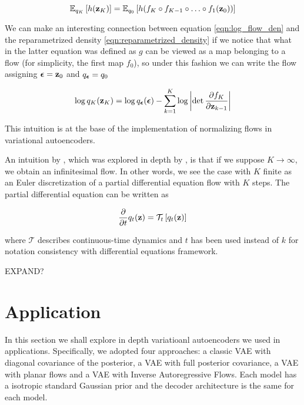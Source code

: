 \documentclass[12pt]{article}
\begin{document}
\begin{equation}
    \mathbb{E}_{q_K}\left[h(\textbf{z}_K)\right] = \mathbb{E}_{q_0}\left[h(f_K \circ f_{K-1} \circ \ldots \circ f_1(\textbf{z}_0))\right]
\end{equation}

We can make an interesting connection between equation \eqref{eqn:log_flow_den} and the reparametrized density \eqref{eqn:reparametrized_density} if we notice that what in the latter equation was defined as \(g\) can be viewed as a map belonging to a flow (for simplicity, the first map \(f_0\)), so under this fashion we can write the flow assigning \(\bm{\epsilon} = \textbf{z}_0\) and \(q_{\bm{\epsilon}} = q_0\)

\begin{equation}
    \log q_K(\textbf{z}_K) = \log q_{\bm{\epsilon}}(\bm{\epsilon}) - \sum_{k=1}^K \log \left| \det \frac{\partial f_K}{\partial \textbf{z}_{k-1}}\right|
\end{equation}

This intuition is at the base of the implementation of normalizing flows in variational autoencoders. 


An intuition by \cite{Mohamed2015VariationalIM}, which was explored in depth by \cite{NEURIPS2018_69386f6b}, is that if we suppose \(K \rightarrow \infty\), we obtain an infinitesimal flow. In other words, we see the case with \(K\) finite as an Euler discretization of a partial differential equation flow \cite{NEURIPS2018_69386f6b} with \(K\) steps. The partial differential equation can be written as 

\begin{equation}
    \frac{\partial}{\partial t} q_t(\textbf{z}) = \mathcal{T}_t\left[q_t(\textbf{z})\right]
\end{equation}

where \(\mathcal{T}\) describes continuous-time dynamics \cite{Mohamed2015VariationalIM} and \(t\) has been used instead of \(k\) for notation consistency with differential equations framework. 

EXPAND?

\section{Application}

In this section we shall explore in depth variatioanl autoencoders we used in applications. Specifically, we adopted four approaches: a classic VAE with diagonal covariance of the posterior, a VAE with full posterior covariance, a VAE with planar flows and a VAE with Inverse Autoregressive Flows. Each model has a isotropic standard Gaussian prior and the decoder architecture is the same for each model.
\end{document}
